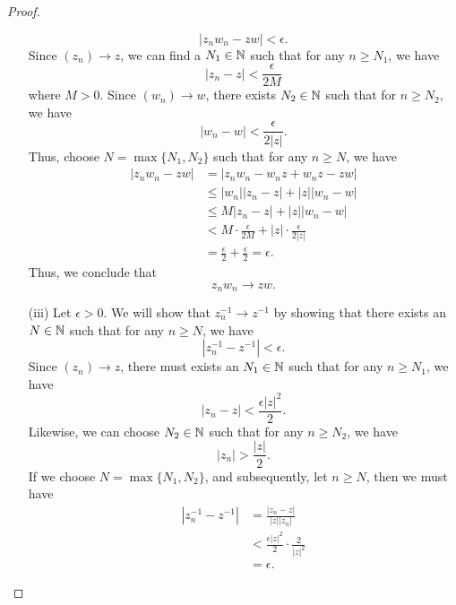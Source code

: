 \documentclass[a4paper]{report}
\begin{document}
\begin{proof}
\begin{enumerate}
        \[  | {z}_{n} {w}_{n} - zw  |  < \epsilon. \]
        Since \( ({z}_{n}) \to z  \), we can find a \( {N}_{1} \in \mathbb{N}  \) such that for any \( n \geq {N}_{1} \), we have   
        \[  | {z}_{n} - z  |  < \frac{ \epsilon  }{  2 M   }   \]
        where \( M > 0  \).
        Since \( ({w}_{n})  \to w \), there exists \( {N}_{2} \in \mathbb{N}  \) such that for \( n \geq {N}_{2} \), we have 
        \[  | {w}_{n} - w  | < \frac{ \epsilon  }{  2 | z  |  }.  \]
        Thus, choose \( N = \max \{ {N}_{1}, {N}_{2} \}  \) such that for any \( n \geq N  \), we have
        \begin{align*}
            | {z}_{n} {w}_{n} - zw  |  &= | {z}_{n} {w}_{n} - {w}_{n} z + {w}_{n} z - zw  |  \\
                                       &\leq | {w}_{n}  | | {z}_{n} - z  | + | z  |  | {w}_{n} - w   | \\
                                       &\leq M | {z}_{n} - z  |  + | z  |  | {w}_{n} - w  |  \\
                                       &< M \cdot \frac{ \epsilon  }{ 2 M  }  + | z  |  \cdot \frac{ \epsilon  }{ 2 | z  |  }  \\
                                       &= \frac{ \epsilon  }{  2 }  + \frac{ \epsilon  }{  2  }  = \epsilon.
        \end{align*}
        Thus, we conclude that 
        \[ {z}_{n} {w}_{n} \to z w.  \]
    \item[(iii)] Let \( \epsilon > 0  \). We will show that \( {z}_{n}^{-1} \to z^{-1} \) by showing that there exists an \( N \in \mathbb{N}  \) such that for any \( n \geq N  \), we have 
        \[  | {z}_{n}^{-1} - z^{-1} | < \epsilon. \]
    Since \( ({z}_{n}) \to z  \), there must exists an \( {N}_{1} \in \mathbb{N}   \) such that for any \( n \geq {N}_{1}  \), we have
    \[  | {z}_{n} - z  |  < \frac{ \epsilon | z  |^{2} }{ 2 }.  \]
    Likewise, we can choose \( {N}_{2} \in \mathbb{N}  \) such that for any \( n \geq {N}_{2} \), we have
    \[  | {z}_{n}  |  > \frac{ | z |  }{ 2 }.  \]
    If we choose \( N = \max \{ {N}_{1}, {N}_{2} \}  \), and subsequently, let \( n \geq N  \), then we must have
    \begin{align*}
      | {z}_{n}^{-1} - z^{-1} |   &= \frac{ | {z}_{n} - z  |  }{  | z  |  | {z}_{n} |  } \\
                                  &< \frac{ \epsilon | z |^{2}  }{ 2  } \cdot \frac{ 2  }{  | z |^{2}  } \\ 
                                  &= \epsilon.
    \end{align*}

\end{enumerate}
\end{proof}
\end{document}
